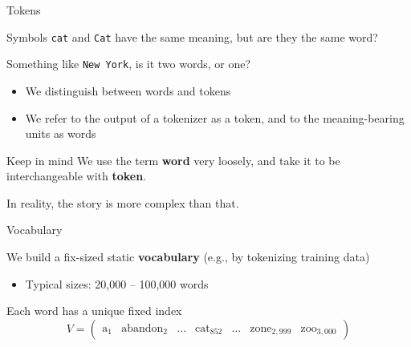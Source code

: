 \documentclass[12pt,aspectratio=169,handout]{beamer}
\begin{document}
\begin{frame}{Tokens}
	
Symbols \texttt{cat} and \texttt{Cat} have the same meaning, but are they the same word?

Something like \texttt{New York}, is it two words, or one?

\begin{itemize}
	\item We distinguish between words and tokens
	\item We refer to the output of a tokenizer as a token, and to the meaning-bearing units as words
\end{itemize}

\begin{block}{Keep in mind}
We use the term \textbf{word} very loosely, and take it to be interchangeable with \textbf{token}.

In reality, the story is more complex than that.	
\end{block}
	
\end{frame}



\begin{frame}{Vocabulary}

We build a fix-sized static \textbf{vocabulary} (e.g., by tokenizing training data)

\begin{itemize}
	\item Typical sizes: 20,000 -- 100,000 words
\end{itemize}

\bigskip

Each word has a unique fixed index
$$
V = \begin{pmatrix}
\text{a}_1 & \text{abandon}_2 & \ldots & \text{cat}_{852} & \ldots & \text{zone}_{2,999} & \text{zoo}_{3,000}
\end{pmatrix}
$$

\end{frame}
\end{document}
